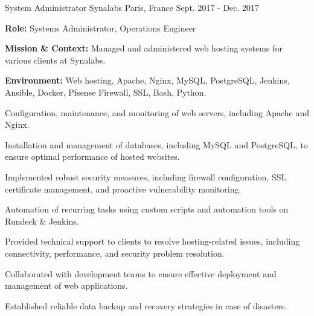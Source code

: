 \begin{cventries}
\cventry
{System Administrator} %
{Synalabs} %
{Paris, France} %
{Sept. 2017 - Dec. 2017} %
{
  \begin{cvitems} %
    \item {\textbf{Role:} Systems Administrator, Operations Engineer}
    \item {\textbf{Mission \& Context:} Managed and administered web hosting systems for various clients at Synalabs.}
    \item {\textbf{Environment:} Web hosting, Apache, Nginx, MySQL, PostgreSQL, Jenkins, Ansible, Docker, Pfsense Firewall, SSL, Bash, Python.} 
    \item {Configuration, maintenance, and monitoring of web servers, including Apache and Nginx.}
    \item {Installation and management of databases, including MySQL and PostgreSQL, to ensure optimal performance of hosted websites.}
    \item {Implemented robust security measures, including firewall configuration, SSL certificate management, and proactive vulnerability monitoring.}
    \item {Automation of recurring tasks using custom scripts and automation tools on Rundeck \& Jenkins.}
    \item {Provided technical support to clients to resolve hosting-related issues, including connectivity, performance, and security problem resolution.}
    \item {Collaborated with development teams to ensure effective deployment and management of web applications.}
    \item {Established reliable data backup and recovery strategies in case of disasters.}
  \end{cvitems}
}


\end{cventries}
